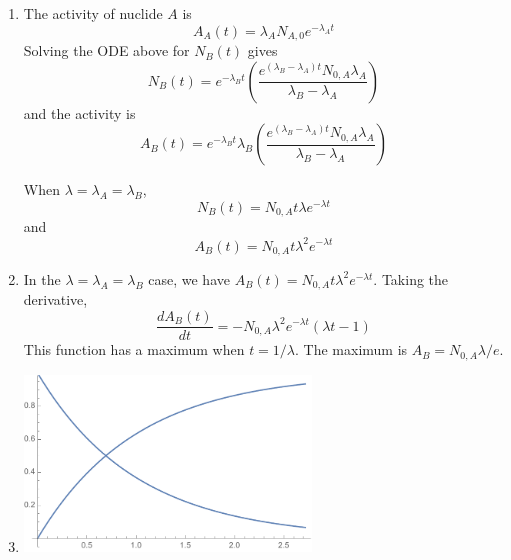 \documentclass[10pt]{article}
\begin{document}
\begin{enumerate}
\begin{enumerate}
        \item The activity of nuclide $A$ is
        \begin{equation*}
            A_A(t) = \lambda_A N_{A,0} e^{-\lambda_A t}
        \end{equation*}
        Solving the ODE above for $N_B(t)$ gives
        \begin{equation*}
            N_B(t) = e^{-\lambda_B t} \left(
                \frac{e^{(\lambda_B-\lambda_A)t}N_{0,A}\lambda_A}{\lambda_B-\lambda_A}
            \right)
        \end{equation*}
        and the activity is
        \begin{equation*}
            A_B(t) = e^{-\lambda_B t} \lambda_B\left(
                \frac{e^{(\lambda_B-\lambda_A)t}N_{0,A}\lambda_A}{\lambda_B-\lambda_A}
            \right)
        \end{equation*}

        When $\lambda=\lambda_A=\lambda_B$,
        \begin{equation*}
            N_B(t) = N_{0,A} t \lambda e^{-\lambda t}
        \end{equation*}
        and
        \begin{equation*}
            A_B(t) = N_{0,A} t \lambda^2 e^{-\lambda t}
        \end{equation*}

        \item In the $\lambda=\lambda_A=\lambda_B$ case, we have $A_B(t) = N_{0,A} t \lambda^2 e^{-\lambda t}$. Taking the derivative,
        \begin{equation*}
            \frac{dA_B(t)}{dt} = -N_{0,A} \lambda^2 e^{-\lambda t} (\lambda  t-1)
        \end{equation*}
        This function has a maximum when $t=1/\lambda$. The maximum is $A_B = N_{0,A}\lambda/e$.

        \item

        \includegraphics[width=0.6\textwidth]{2eplot}


\end{enumerate}
\end{enumerate}
\end{document}
